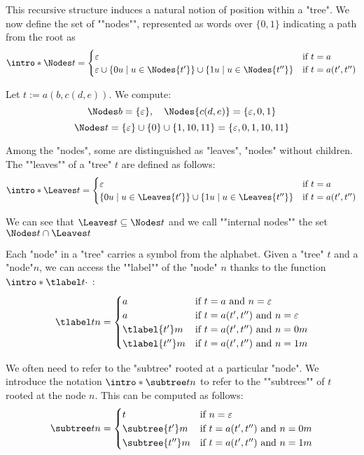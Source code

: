 \documentclass[a4paper,UKenglish,cleveref, autoref, thm-restate]{lipics-v2021}
\begin{document}
\AP This recursive structure induces a natural notion of position within a "tree". We now define the set of ""nodes"",
represented as words over $\{0,1\}$ indicating a path from the root as
\[
	\intro* \Nodes t   =
	\begin{cases}
		\varepsilon                             & \text{if } t = a         \\
		\varepsilon \cup \setdef {0u} {u \in \Nodes {t'}}
		\cup \setdef {1u} {u \in \Nodes {t''} } & \text{if } t = a(t',t'')
	\end{cases}
\]

\begin{example}
	Let $ t := a(b, c(d, e)) $. We compute:
	\[
		\Nodes b  = \{\varepsilon\}, \quad \Nodes {c(d, e)} = \{\varepsilon, 0, 1\}
	\]
	\[
		\Nodes t = \{\varepsilon\} \cup \{0\} \cup \{1, 10, 11\} = \{\varepsilon, 0, 1, 10, 11\}
	\]
\end{example}

Among the "nodes", some are distinguished as "leaves", "nodes" without children.
\AP The ""leaves"" of a "tree" $t$ are defined as follows:
\[
	\intro* \Leaves t = \begin{cases}
		\varepsilon                              & \text{if } t = a         \\
		\setdef {0u} {u \in \Leaves {t'}}
		\cup \setdef {1u} {u \in \Leaves {t''} } & \text{if } t = a(t',t'')
	\end{cases}
\]

\AP We can see that $\Leaves t \subseteq \Nodes t $ and we call ""internal nodes"" the set $\Nodes t \cap \Leaves t$


Each "node" in a "tree" carries a symbol from the alphabet.
\AP Given a "tree" $t$ and a "node"$n$, we can access the ""label"" of the "node" $n$
thanks to the function $\intro* \tlabel t {\cdot}$ :
\[
	\tlabel t n =   \begin{cases}
		a               & \text{if } t = a \text{ and } n = \varepsilon         \\
		a               & \text{if } t = a(t',t'') \text{ and } n = \varepsilon \\
		\tlabel {t'} m  & \text{if } t = a(t',t'') \text{ and } n = 0m          \\
		\tlabel {t''} m & \text{if } t = a(t',t'') \text{ and } n = 1m
	\end{cases}
\]

We often need to refer to the "subtree" rooted at a particular "node".
\AP We introduce the notation $\intro* \subtree t n$ to refer to the ""subtrees""
of $t$ rooted at the node $n$. This can be computed as follows:
\[
	\subtree t n =   \begin{cases}
		t                & \text{if }  n = \varepsilon                  \\
		\subtree {t'} m  & \text{if } t = a(t',t'') \text{ and } n = 0m \\
		\subtree {t''} m & \text{if } t = a(t',t'') \text{ and } n = 1m
	\end{cases}
\]
\end{document}
